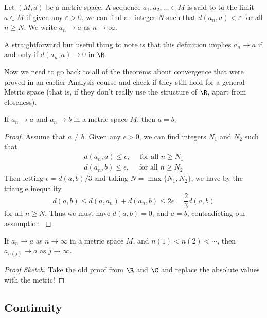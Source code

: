 \begin{definition}[Convergence]
    Let $(M, d)$ be a metric space. A sequence $a_1, a_2, \dots \in M$ is said to  to the limit $a \in M$ if given any $\varepsilon > 0$, we can find an integer $N$ such that $d(a_n, a) < \varepsilon$ for all $n \geq N$. We write $a_n \rightarrow a$ as $n \rightarrow \infty$.
\end{definition}

A straightforward but useful thing to note is that this definition implies $a_n \rightarrow a$ if and only if $d(a_n, a) \rightarrow 0$ in $\R$.

Now we need to go back to all of the theorems about convergence that were proved in an earlier Analysis course and check if they still hold for a general Metric space (that is, if they don't really use the structure of $\R$, apart from closeness).

\begin{lemma}
    If $a_n \rightarrow a$ and $a_n \rightarrow b$ in a metric space $M$, then $a = b$.
\end{lemma}
\begin{proof}
	Assume that $a \neq b$. Given any $\epsilon > 0$, we can find integers $N_1$ and $N_2$ such that
	\begin{align*}
		d(a_n, a) \leq \epsilon, \quad \text{ for all $n \geq N_1$}\\
		d(a_n, b) \leq \epsilon, \quad \text{ for all $n \geq N_2$}
	\end{align*}
	Then letting $\epsilon = d(a, b)/3$ and taking $N = \max\{N_1, N_2\}$, we have by the triangle inequality
	$$
	d(a, b) \leq d(a, a_n) + d(a_n, b) \leq 2\epsilon = \frac{2}{3} d(a, b)
	$$
	for all $n \geq N$.
	Thus we must have $d(a, b) = 0$, and $a = b$, contradicting our assumption.
\end{proof}

\begin{lemma}
    If $a_n \rightarrow a$ as $n \rightarrow \infty$ in a metric space $M$, and $n(1) < n(2) < \cdots$, then $a_{n(j)} \rightarrow a$ as $j \rightarrow \infty$.
\end{lemma}
\begin{proof}[Proof Sketch]
    Take the old proof from $\R$ and $\C$ and replace the absolute values with the metric!
\end{proof}

\subsection{Continuity}

